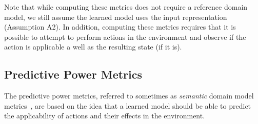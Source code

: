 \documentclass{article}
\theoremstyle{definition}
\theoremstyle{remark}
\newif\ifaddcomments
\newcommand{\roni}[1]{\ifaddcomments{\textcolor{red}{[Roni: #1]}}\fi}
\begin{document}
Note that while computing these metrics does not require a reference domain model, we still assume the learned model uses the input representation (Assumption A2).  
In addition, computing these metrics requires that it is possible to attempt to perform actions in the environment and observe if the action is applicable a well as the resulting state (if it is). %










\subsection{Predictive Power Metrics}
\label{sec:predictiveness-metrics}
The predictive power metrics, referred to sometimes as \emph{semantic} domain model metrics~\citep{aineto2019learning,mordoch2024safe,le2024learning}, are based on the idea that a learned model should be able to predict the applicability of actions and their effects in the environment. 
\end{document}
